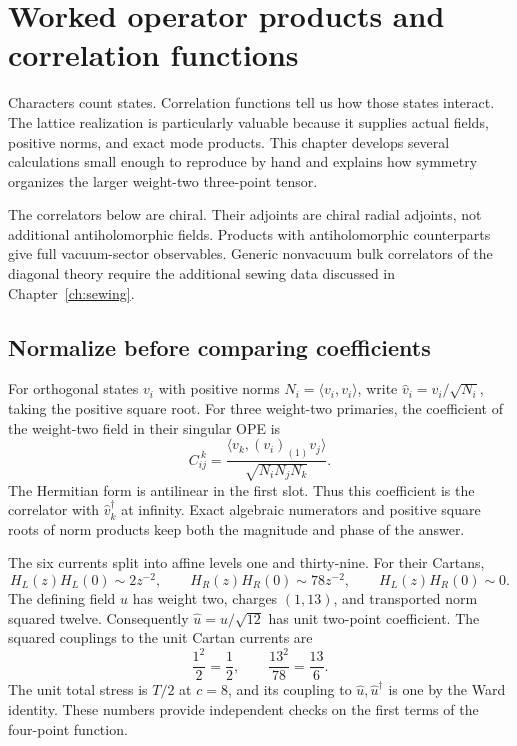 \chapter{Worked operator products and correlation functions}
\label{ch:correlators}

Characters count states. Correlation functions tell us how those
states interact. The lattice realization is particularly valuable
because it supplies actual fields, positive norms, and exact mode
products. This chapter develops several calculations small enough
to reproduce by hand and explains how symmetry organizes the larger
weight-two three-point tensor.

The correlators below are chiral. Their adjoints are chiral radial
adjoints, not additional antiholomorphic fields. Products with
antiholomorphic counterparts give full vacuum-sector observables.
Generic nonvacuum bulk correlators of the diagonal theory require
the additional sewing data discussed in Chapter~\ref{ch:sewing}.

\section{Normalize before comparing coefficients}

For orthogonal states $v_i$ with positive norms
$N_i=\langle v_i,v_i\rangle$, write
$\widehat v_i=v_i/\sqrt{N_i}$, taking the positive square root.
For three weight-two primaries, the coefficient of the weight-two
field in their singular OPE is
\begin{equation}
 C_{ij}^{\ k}=
 \frac{\langle v_k,(v_i)_{(1)}v_j\rangle}
      {\sqrt{N_iN_jN_k}}.
 \label{eq:corr-normalization}
\end{equation}
The Hermitian form is antilinear in the first slot. Thus this
coefficient is the correlator with $\widehat v_k^\dagger$ at
infinity. Exact algebraic numerators and positive square roots of
norm products keep both the magnitude and phase of the answer.

The six currents split into affine levels one and thirty-nine.
For their Cartans,
\[
 H_L(z)H_L(0)\sim2z^{-2},\qquad
 H_R(z)H_R(0)\sim78z^{-2},\qquad H_L(z)H_R(0)\sim0.
\]
The defining field $u$ has weight two, charges $(1,13)$, and
transported norm squared twelve. Consequently
$\widehat u=u/\sqrt{12}$ has unit two-point coefficient.
The squared couplings to the unit Cartan currents are
\begin{equation}
 \frac{1^2}{2}=\frac12,
 \qquad \frac{13^2}{78}=\frac{13}{6}.
 \label{eq:corr-current-couplings}
\end{equation}
The unit total stress is $T/2$ at $c=8$, and its coupling to
$\widehat u,\widehat u^\dagger$ is one by the Ward identity.
These numbers provide independent checks on the first terms of
the four-point function.

